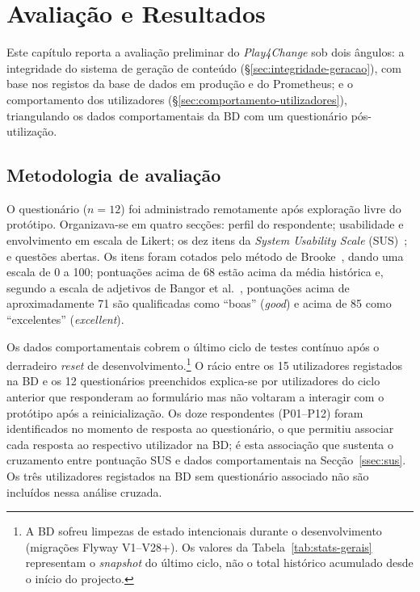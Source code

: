 %
%
%
\chapter{Avaliação e Resultados}
\label{cha:avaliacao}

Este capítulo reporta a avaliação preliminar do \emph{Play4Change} sob dois ângulos: a integridade do sistema de geração de conteúdo (§\ref{sec:integridade-geracao}), com base nos registos da base de dados em produção e do Prometheus; e o comportamento dos utilizadores (§\ref{sec:comportamento-utilizadores}), triangulando os dados comportamentais da BD com um questionário pós-utilização.

\section{Metodologia de avaliação}
\label{sec:metodologia-avaliacao}

O questionário ($n=12$) foi administrado remotamente após exploração livre do protótipo. Organizava-se em quatro secções: perfil do respondente; usabilidade e envolvimento em escala de Likert; os dez itens da \emph{System Usability Scale} (SUS)~\cite{brooke1996sus}; e questões abertas. Os itens foram cotados pelo método de Brooke~\cite{brooke1996sus}, dando uma escala de 0 a 100; pontuações acima de 68 estão acima da média histórica e, segundo a escala de adjetivos de Bangor et al.~\cite{bangor2008empirical}, pontuações acima de aproximadamente 71 são qualificadas como ``boas'' (\emph{good}) e acima de 85 como ``excelentes'' (\emph{excellent}).

Os dados comportamentais cobrem o último ciclo de testes contínuo após o derradeiro \emph{reset} de desenvolvimento.\footnote{A BD sofreu limpezas de estado intencionais durante o desenvolvimento (migrações Flyway V1--V28+). Os valores da Tabela~\ref{tab:stats-gerais} representam o \emph{snapshot} do último ciclo, não o total histórico acumulado desde o início do projecto.} O rácio entre os 15 utilizadores registados na BD e os 12 questionários preenchidos explica-se por utilizadores do ciclo anterior que responderam ao formulário mas não voltaram a interagir com o protótipo após a reinicialização. Os doze respondentes (P01--P12) foram identificados no momento de resposta ao questionário, o que permitiu associar cada resposta ao respectivo utilizador na BD; é esta associação que sustenta o cruzamento entre pontuação SUS e dados comportamentais na Secção~\ref{ssec:sus}. Os três utilizadores registados na BD sem questionário associado não são incluídos nessa análise cruzada.

